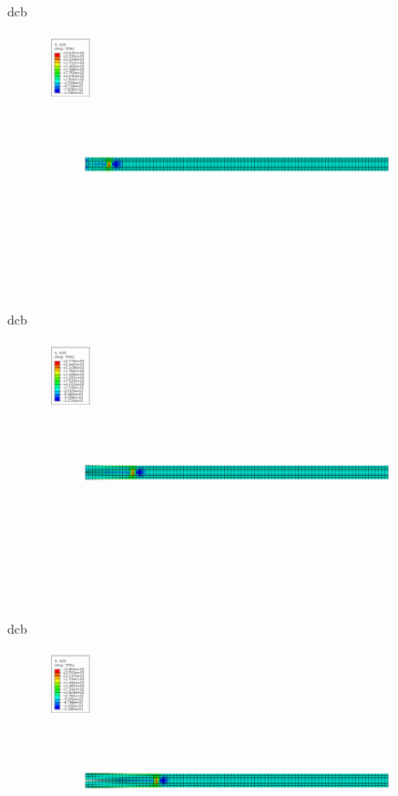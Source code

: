 \documentclass[10pt]{beamer}
\begin{document}
	\begin{frame}{dcb}
		\begin{figure}
			\centering
			\includegraphics[width=0.9\linewidth]{../Figures/dcb3}
		\end{figure}
	\end{frame}

	\begin{frame}{dcb}
		\begin{figure}
			\centering
			\includegraphics[width=0.9\linewidth]{../Figures/dcb4}
		\end{figure}
	\end{frame}

	\begin{frame}{dcb}
		\begin{figure}
			\centering
			\includegraphics[width=0.9\linewidth]{../Figures/dcb5}
		\end{figure}
	\end{frame}
\end{document}
